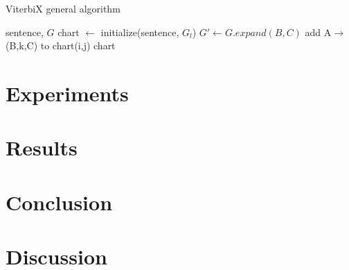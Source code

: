 \documentclass[a4paper]{article}
\begin{document}
\begin{algorithm}
\caption{ViterbiX general algorithm}
\begin{algorithmic}[1]
\REQUIRE sentence, $G$
\STATE chart $\leftarrow$ initialize(sentence, $G_l$)
        \STATE $G' \leftarrow G.expand(B, C)$
                \STATE add A$\rightarrow$(B,k,C) to chart(i,j)
            \ENDIF
        \ENDFOR
    \ENDFOR
\ENDFOR
\RETURN chart
\end{algorithmic}
\label{alg:viterbix}
\end{algorithm}
\section{Experiments}
\label{sec:experiments}
\section{Results}
\label{sec:results}
\section{Conclusion}
\label{sec:conclusion}
\section{Discussion}
\label{sec:discussion}



\end{document}
